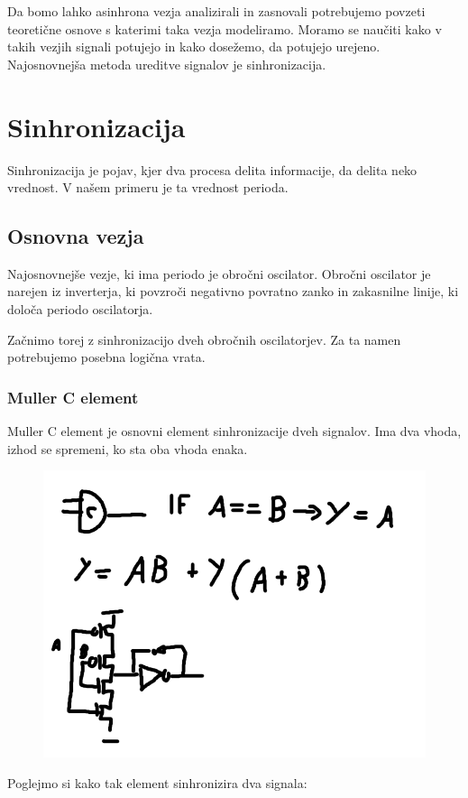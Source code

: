
Da bomo lahko asinhrona vezja analizirali in zasnovali potrebujemo povzeti teoretične osnove s katerimi taka vezja modeliramo. Moramo se naučiti kako v takih vezjih signali potujejo in kako dosežemo, da potujejo urejeno. Najosnovnejša metoda ureditve signalov je sinhronizacija.


\section{Sinhronizacija} \label{a}

Sinhronizacija je pojav, kjer dva procesa delita informacije, da delita neko vrednost. V našem primeru je ta vrednost perioda.

\subsection{Osnovna vezja} \label{b}
Najosnovnejše vezje, ki ima periodo je obročni oscilator. Obročni oscilator je narejen iz inverterja, ki povzroči negativno povratno zanko in zakasnilne linije, ki določa periodo oscilatorja.

Začnimo torej z sinhronizacijo dveh obročnih oscilatorjev. Za ta namen potrebujemo posebna logična vrata.

\subsubsection{Muller C element} \label{c}
Muller C element je osnovni element sinhronizacije dveh signalov. Ima dva vhoda, izhod se spremeni, ko sta oba vhoda enaka.

\begin{figure}
	\centering
	\includegraphics[width=0.7\linewidth]{slike/C_Element}
	\caption{}
	\label{fig:celement}
\end{figure}

Poglejmo si kako tak element sinhronizira dva signala:

